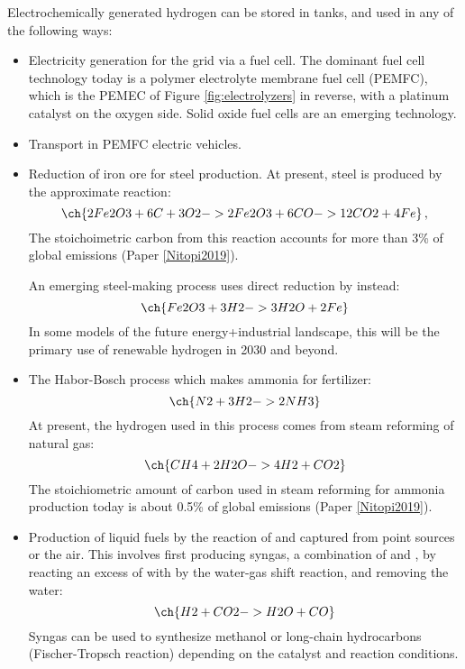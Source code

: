 Electrochemically generated hydrogen can be stored in tanks, and used in any of the following ways:
\begin{itemize}
	\item Electricity generation for the grid via a fuel cell. The dominant fuel cell technology today is a polymer electrolyte membrane fuel cell (PEMFC), which is the PEMEC of Figure \ref{fig:electrolyzers} in reverse, with a platinum catalyst on the oxygen side\cite{Debe2012}. Solid oxide fuel cells are an emerging technology.
	
	\item Transport in PEMFC electric vehicles.
	
	\item Reduction of iron ore for steel production.  At present, steel is produced by the approximate reaction:
	\begin{equation}
	\ch{2 Fe2O3 + 6 C + 3 O2 -> 2 Fe2O3 + 6 CO -> 12 CO2 + 4 Fe}\,, 
	\end{equation} 
	The stoichoimetric carbon from this reaction accounts for more than 3\% of global  emissions (Paper \ref{Nitopi2019}).
	
	An emerging steel-making process\cite{Fischedick2014} uses direct reduction by  instead:
	\begin{equation}
	\ch{Fe2O3 + 3 H2 -> 3 H2O + 2 Fe}
	\end{equation}
	In some models of the future energy+industrial landscape, this will be the primary use of renewable hydrogen in 2030 and beyond\cite{Sgobbi2016}.
	
	\item The Habor-Bosch process which makes ammonia for fertilizer: 
	\begin{equation}
	\ch{N2 + 3 H2 -> 2 NH3}
	\end{equation}
	At present, the hydrogen used in this process comes from steam reforming of natural gas:
	\begin{equation}
	\ch{CH4 + 2 H2O -> 4 H2 + CO2}
	\end{equation}
	The stoichiometric amount of carbon used in steam reforming for ammonia production today is about 0.5\% of global  emissions (Paper \ref{Nitopi2019}).
	
	\item Production of liquid fuels by the reaction of  and  captured from point sources or the air. This involves first producing syngas, a combination of  and , by reacting an excess of  with  by the water-gas shift reaction, and removing the water:
	\begin{equation}
	\ch{H2 + CO2 -> H2O + CO}
	\end{equation}
	Syngas can be used to synthesize methanol or long-chain hydrocarbons (Fischer-Tropsch reaction) depending on the catalyst and reaction conditions\cite{Concepts2003}.
\end{itemize}

